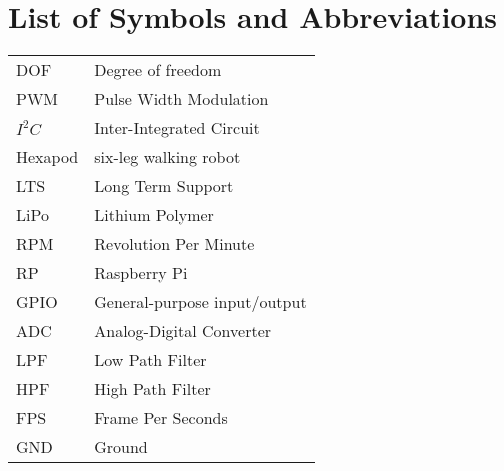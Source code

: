 

\usepackage[colorinlistoftodos]{todonotes}


\pagestyle{empty}


\maketitle 						%

\frontmatter %
\pagestyle{fancy}



\tableofcontents
\listoffigures
\listoftables
\listofalgorithms


\chapter*{List of Symbols and Abbreviations}

\begin{tabular}{l l}
	DOF      & Degree of freedom    \\
	PWM     & Pulse Width Modulation       \\
	$I^2C$  & Inter-Integrated Circuit     \\
	Hexapod & six-leg walking robot\\
	LTS     & Long Term Support     \\
	LiPo     & Lithium Polymer      \\
	RPM     & Revolution Per Minute\\
	RP      & Raspberry Pi \\
	GPIO   & General-purpose input/output \\
	ADC    & Analog-Digital Converter     \\
	LPF     & Low Path Filter      \\
	HPF    & High Path Filter     \\
	FPS     & Frame Per Seconds    \\
	GND   & Ground
\end{tabular} 


